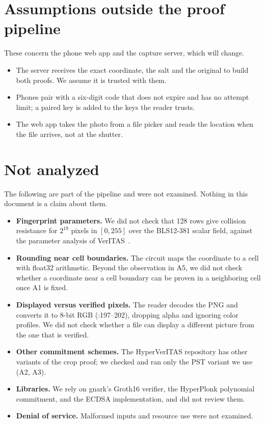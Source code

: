 \documentclass[11pt,a4paper]{article}
\newcommand{\file}[2]{\code{#1}:#2}
\begin{document}
\section{Assumptions outside the proof pipeline}\label{sec:assumptions}

These concern the phone web app and the capture server, which will change.
\begin{itemize}[itemsep=2pt]
  \item The server receives the exact coordinate, the salt and the original to
    build both proofs. We assume it is trusted with them.
  \item Phones pair with a six-digit code that does not expire and has no
    attempt limit; a paired key is added to the keys the reader trusts.
  \item The web app takes the photo from a file picker and reads the location
    when the file arrives, not at the shutter.
\end{itemize}

\section{Not analyzed}\label{sec:not-analyzed}

The following are part of the pipeline and were not examined. Nothing in this
document is a claim about them.
\begin{itemize}[itemsep=2pt]
  \item \textbf{Fingerprint parameters.} We did not check that 128 rows give
    collision resistance for $2^{19}$ pixels in $[0,255]$ over the BLS12-381
    scalar field, against the parameter analysis of VerITAS~\cite{veritas}.
  \item \textbf{Rounding near cell boundaries.} The circuit maps the
    coordinate to a cell with float32 arithmetic. Beyond the observation in
    A5, we did not check whether a coordinate near a cell boundary can be
    proven in a neighboring cell once A1 is fixed.
  \item \textbf{Displayed versus verified pixels.} The reader decodes the PNG
    and converts it to 8-bit RGB (\file{crates/provenance/src/capture.rs}{197--202}),
    dropping alpha and ignoring color profiles. We did not check whether a
    file can display a different picture from the one that is verified.
  \item \textbf{Other commitment schemes.} The HyperVerITAS repository has
    other variants of the crop proof; we checked and ran only the PST variant
    we use (A2, A3).
  \item \textbf{Libraries.} We rely on gnark's Groth16 verifier, the
    HyperPlonk polynomial commitment,  and the ECDSA
    implementation, and did not review them.
  \item \textbf{Denial of service.} Malformed inputs and resource use were not
    examined.
\end{itemize}
\end{document}
